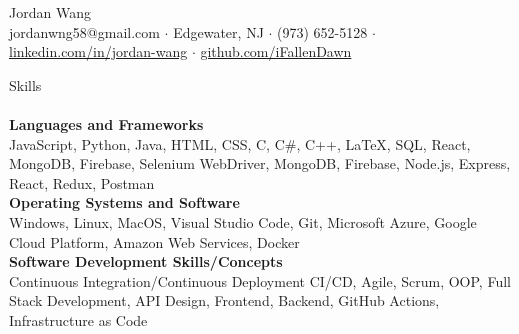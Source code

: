 \documentclass[10pt]{article}
\newcommand{\lineunder} {
    \vspace*{-8pt} \\
    \hspace*{-18pt} \hrulefill \\
}
\newcommand{\header}[1]{
    {\hspace*{-18pt}\vspace*{6pt} #1}
    \vspace*{-6pt} \lineunder
}
\begin{document}
\vspace*{-40pt}

    

\vspace*{2pt}
\begin{center}
	{\Huge {Jordan Wang}}\\
	\vspace{2mm}
	jordanwng58@gmail.com $\cdot$ Edgewater, NJ $\cdot$ (973) 652-5128 $\cdot$ \href{https://www.linkedin.com/in/jordan-wang/}{linkedin.com/in/jordan-wang} $\cdot$ \href{https://github.com/iFallenDawn}{github.com/iFallenDawn} \\
\end{center}
\vspace{-2mm}

\header{Skills}
{\textbf{Languages and Frameworks}} \hfill 
\\
	JavaScript, Python, Java, HTML, CSS, C, C\#, C++, \LaTeX, SQL, React, MongoDB, Firebase, Selenium WebDriver, MongoDB, Firebase, Node.js, Express, React, Redux, Postman
 \\
\vspace{1mm}
 {\textbf{Operating Systems and Software}} \hfill 
 \\
 Windows, Linux, MacOS, Visual Studio Code, Git, Microsoft Azure, Google Cloud Platform, Amazon Web Services, Docker
 \\
\vspace{1mm}
{\textbf{Software Development Skills/Concepts}} \hfill 
 \\
Continuous Integration/Continuous Deployment CI/CD, Agile, Scrum, OOP, Full Stack Development, API Design, Frontend, Backend, GitHub Actions, Infrastructure as Code
\vspace{2mm}

\end{document}
